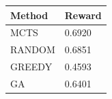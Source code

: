 \begin{tabular}{ll}
\hline
Method & Reward \\
\hline
  MCTS & 0.6920 \\
  RANDOM & 0.6851 \\
  GREEDY & 0.4593 \\
  GA & 0.6401 \\
\hline
\end{tabular}

